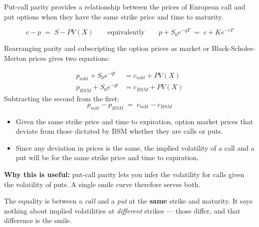 
Put-call parity provides a relationship between the prices of European call and put options when
they have the same strike price and time to maturity.

\begin{mrfmlbox}
\[ c - p \;=\; S - PV(X)
   \qquad\text{equivalently}\qquad
   p + S_0 e^{-qT} \;=\; c + K e^{-rT} \]
\end{mrfmlbox}

Rearranging parity and subscripting the option prices as market or Black-Scholes-Merton prices
gives two equations:

\begin{mrfmlbox}
\begin{align*}
p_{mkt} + S_0 e^{-qt} &= c_{mkt} + PV(X)\\
p_{BSM} + S_0 e^{-qt} &= c_{BSM} + PV(X)
\end{align*}
Subtracting the second from the first:
\[ \boxed{\;p_{mkt} - p_{BSM} \;=\; c_{mkt} - c_{BSM}\;} \]
\end{mrfmlbox}

\begin{mrkeybox}[title={What this means}]
\begin{itemize}
\item Given the same strike price and time to expiration, option market prices that deviate from
      those dictated by BSM  whether they are calls or puts.
\item Since any deviation in prices is the same, the implied volatility of a call and a put will
      be  for the same strike price and time to expiration.
\end{itemize}
\medskip
\textbf{Why this is useful:} put-call parity lets you infer the volatility for calls given the
volatility of puts. A single smile curve therefore serves both.
\end{mrkeybox}

\begin{mrtrapbox}
The equality is between a \textit{call} and a \textit{put} at the \textbf{same} strike and
maturity. It says nothing about implied volatilities at \textit{different} strikes --- those
differ, and that difference is the smile.
\end{mrtrapbox}


